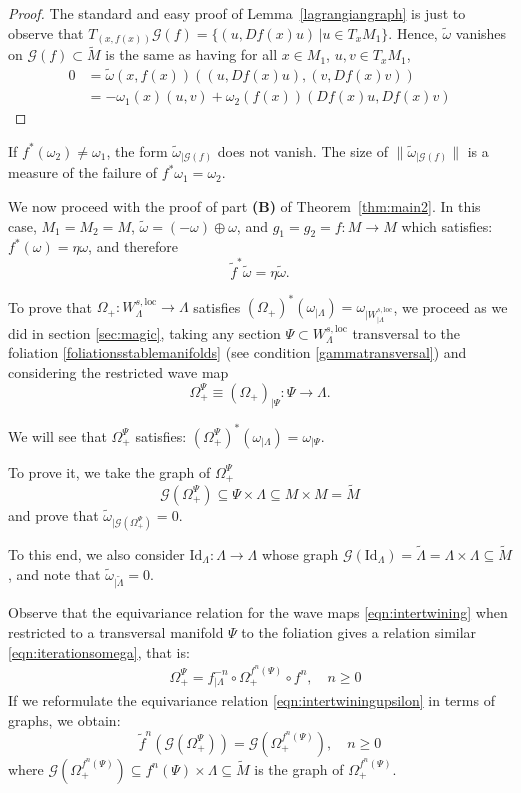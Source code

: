 \documentclass[11pt]{amsart}
\theoremstyle{definition}
\theoremstyle{remark}
\numberwithin{equation}{section}
\newcommand{\G}{\mathcal{G}}
\begin{document}
\begin{proof}
The standard and easy proof of Lemma~\ref{lagrangiangraph}
is just to observe that $T_{(x,f(x))}  \G(f)= \{(u, Df(x)u ) \, | u \in T_x M_1 \}$.
Hence, $\tilde \omega$ vanishes on $\G(f) \subset \tilde{M}$  is the same as  having for all
$x \in M_1$,
$u,v \in T_x M_1$,
\[
\begin{split}
0 &= \tilde{\omega}(x,f(x)) ((u, Df(x)u), (v, Df(x)v) )\\
&  =
- \omega_1 (x)(u,v) + \omega_2 (f(x))( Df(x)u, Df(x)v)
\end{split}
\]
\end{proof}


If $f^*(\omega_2)\ne \omega_1$,  the  form ${\tilde \omega}_{\mid\G(f)}$ does not vanish.
The size of  $\|\tilde {\omega}_{\mid\G(f)}\|$ is a measure of the failure of
$f^*\omega_1 = \omega_2$.

We now proceed with the proof of part {\bf(B)} of
Theorem~\ref{thm:main2}.
In this case, $M_1=M_2=M$, $\tilde{\omega}=(-\omega)\oplus\omega$,  and $g_1=g_2=f:M\to M$ which satisfies:
$f^*(\omega)=\eta \omega$,
and therefore
  \[
  \tilde f^* \tilde \omega = \eta \tilde \omega .
  \]

  To prove that $\Omega_+:  W^{s,\mathrm{loc}}_\Lambda \to \Lambda$
  satisfies
  $(\Omega_+)^*(\omega_{\mid \Lambda})=\omega_{\mid W^{s,\mathrm{loc}}_{\mid \Lambda}}$, we
proceed as we did in section \ref{sec:magic}, taking any section $\Psi \subset W^{s,\mathrm{loc}}_\Lambda$ transversal to the foliation \eqref{foliationsstablemanifolds} (see condition  \eqref{gammatransversal}) and considering the restricted  wave map
\[
\Omega_+^\Psi\equiv (\Omega_+)_{\mid \Psi}:\Psi\to \Lambda.
\]

We will see that $\Omega_+^\Psi$
satisfies:
$ (\Omega_+^\Psi)^* (\omega_{\mid \Lambda}) = \omega_{\mid \Psi}$.


To prove it,
we  take the  graph of $\Omega_+^\Psi$
\[
\G(\Omega_+^\Psi)\subseteq \Psi\times \Lambda\subseteq M\times M =\tilde M
\]
and prove that
$\tilde \omega_{\mid \G(\Omega_+^\Psi)}=0$.

To this end, we also consider
 $\textrm{Id}_{\Lambda}:\Lambda\to\Lambda$
 whose graph
 $\G(\textrm{Id}_{\Lambda})=\tilde\Lambda=\Lambda\times\Lambda\subseteq \tilde M$,
 and note that
$\tilde\omega_{\mid\tilde\Lambda}=0$.

Observe that the equivariance relation for the wave maps \eqref{eqn:intertwining} when restricted to a transversal manifold $\Psi$ to the foliation gives a relation similar \eqref{eqn:iterationsomega}, that is:
\begin{equation}\label{eqn:intertwiningupsilon}
\begin{split}
&\Omega_+^{\Psi}=f_{\mid\Lambda}^{-n}\circ\Omega_+^{f^n(\Psi)}\circ f^{n}, \quad n\ge 0
\end{split}
\end{equation}
If we reformulate the equivariance relation \eqref{eqn:intertwiningupsilon}  in
terms of graphs, we obtain:
\[
{\tilde f}^n( \G(\Omega_+^\Psi)) =
  \G(\Omega_+^{f^n(\Psi)}),\quad n\ge 0
\]
where
$\G(\Omega_+^{f^n(\Psi)})\subseteq  f^n(\Psi)\times\Lambda \subseteq \tilde M$ is the graph of $\Omega^{f^n(\Psi)}_+$.
\end{document}
